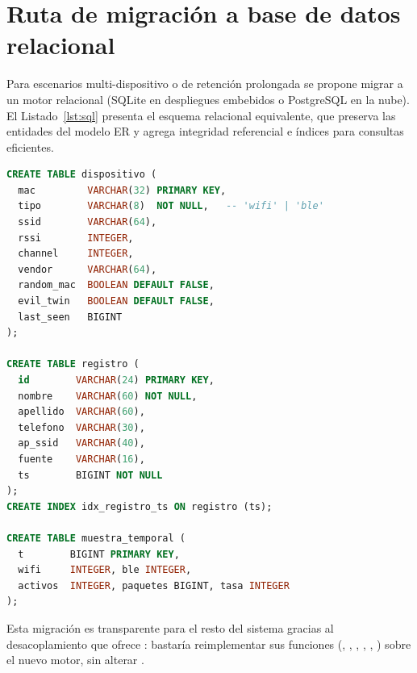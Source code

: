 \section{Ruta de migración a base de datos relacional}
\label{sec:migracion}
Para escenarios multi\nobreakdash-dispositivo o de retención prolongada se propone migrar a un motor relacional (SQLite en despliegues embebidos o PostgreSQL en la nube). El Listado~\ref{lst:sql} presenta el esquema relacional equivalente, que preserva las entidades del modelo ER y agrega integridad referencial e índices para consultas eficientes.

\begin{lstlisting}[language=SQL,caption={Esquema relacional propuesto},label={lst:sql},basicstyle=\ttfamily\footnotesize,keywordstyle=\color{codekw}\bfseries]
CREATE TABLE dispositivo (
  mac         VARCHAR(32) PRIMARY KEY,
  tipo        VARCHAR(8)  NOT NULL,   -- 'wifi' | 'ble'
  ssid        VARCHAR(64),
  rssi        INTEGER,
  channel     INTEGER,
  vendor      VARCHAR(64),
  random_mac  BOOLEAN DEFAULT FALSE,
  evil_twin   BOOLEAN DEFAULT FALSE,
  last_seen   BIGINT
);

CREATE TABLE registro (
  id        VARCHAR(24) PRIMARY KEY,
  nombre    VARCHAR(60) NOT NULL,
  apellido  VARCHAR(60),
  telefono  VARCHAR(30),
  ap_ssid   VARCHAR(40),
  fuente    VARCHAR(16),
  ts        BIGINT NOT NULL
);
CREATE INDEX idx_registro_ts ON registro (ts);

CREATE TABLE muestra_temporal (
  t        BIGINT PRIMARY KEY,
  wifi     INTEGER, ble INTEGER,
  activos  INTEGER, paquetes BIGINT, tasa INTEGER
);
\end{lstlisting}

Esta migración es transparente para el resto del sistema gracias al desacoplamiento que ofrece : bastaría reimplementar sus funciones (, , , , , ) sobre el nuevo motor, sin alterar .
